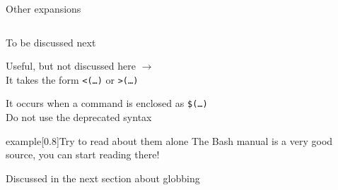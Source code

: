 \begin{frame}{Other expansions}
    \vspace{-12mm}
    \begin{columns}
        \begin{column}{\dimexpr\paperwidth-10mm}
            \begin{center}
                \large{}
            \end{center}
            \begin{description}
                \setlength{\itemsep}{3mm}
                \item[Tilde expansion:]
                    To be discussed next
                \item[Process substitution:]
                    Useful, but not discussed here $\to$ \\
                    It takes the form \alert{\texttt{<(\ldots)}} or \alert{\texttt{>(\ldots)}}
                \item[Command substitution:]
                    It occurs when a command is enclosed as \alert{\texttt{\$(\ldots)}}\\
                    Do not use the deprecated syntax 
            \end{description}
            \vspace{-2mm}
            \begin{varblock}{example}[0.8\textwidth]{Try to read about them alone}
                The Bash manual is a very good source, you can start reading there!\\
            \end{varblock}
            \begin{center}
                \large{}
            \end{center}
            \begin{description}[\hspace{0.4\textwidth}]
                \item[Filename expansion:]
                    Discussed in the next section about globbing
            \end{description}
        \end{column}
    \end{columns}
\end{frame}
